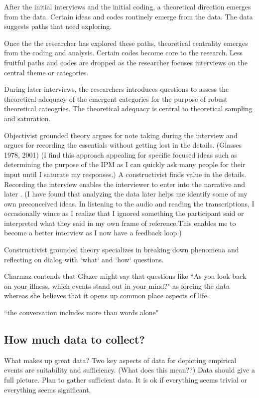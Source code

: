 After the initial interviews and the initial coding, a theoretical direction emerges from the data. Certain ideas and codes routinely emerge from the data. The data suggests paths that need exploring.

Once the the researcher has explored these paths, theoretical centrality emerges from the coding and analysis. Certain codes become core to the research. Less fruitful paths and codes are dropped as the researcher focuses interviews on the central theme or categories. 

During later interviews, the researchers introduces questions to assess the theoretical adequacy of the emergent categories for the purpose of robust theoretical cateogries. The theoretical adequacy is central to theoretical sampling and saturation. 

Objectivist grounded theory argues for note taking during the interview and argues for recording the essentials without getting lost in the details. (Glasses 1978, 2001) (I find this approach appealing for specific focused ideas such as determining the purpose of the IPM as I can quickly ask many people for their input until I saturate my responses.) A constructivist finds value in the details. Recording the interview enables the interviewer to enter into the narrative and later . (I have found that analyzing the data later helps me identify some of my own preconceived ideas. In listening to the audio and reading the transcriptions, I occasionally wince as I realize that I ignored something the participant said or interpreted what they said in my own frame of reference.This enables me to become a better interview as I now have a feedback loop.) 

Constructivist grounded theory specializes in breaking down phenomena and reflecting on dialog with `what` and `how` questions.

Charmaz contends that Glazer might say that questions like ``As you look back on your illness, which events stand out in your mind?" as forcing the data whereas she believes that it opens up common place aspects of life.

``the conversation includes more than words alone"



\subsection{How much data to collect?}

What makes up great data?
Two key aspects of data for depicting empirical events are suitability and sufficiency. (What does this mean??) Data should give a full picture. Plan to gather sufficient data. It is ok if everything seems trivial or everything seems significant.

